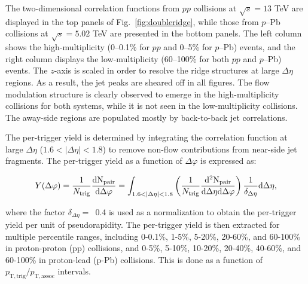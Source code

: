 The two-dimensional correlation functions from $pp$ collisions at $\sqrt{s}=13$ TeV are displayed in the top panels of Fig.~\ref{fig:doubleridge}, while those from $p$--Pb collisions at $\sqrt{s}=5.02$ TeV are presented in the bottom panels. The left column shows the high-multiplicity (0--0.1\% for $pp$ and 0--5\% for $p$--Pb) events, and the right column displays the low-multiplicity (60--100\% for both $pp$ and $p$--Pb) events.  
The $z$-axis is scaled in order to resolve the ridge structures at large $\Delta\eta$ regions.
As a result, the jet peaks are sheared off in all figures. The flow modulation structure is clearly observed to emerge in the high-multiplicity collisions for both systems, while it is not seen in the low-multiplicity collisions. The away-side regions are populated mostly by back-to-back jet correlations. 

The per-trigger yield is determined by integrating the correlation function at large $\Delta\eta$ ($1.6<|\Delta\eta|<1.8$) to remove non-flow contributions from near-side jet fragments.
The per-trigger yield as a function of $\Delta\varphi$ is expressed as:

\begin{eqnarray}
Y(\Delta\varphi) = \frac{1}{N_{\rm{trig}}} \frac{\rm{d}N_{\rm{pair}}}{\rm{d}\Delta\varphi} = \int_{1.6<|\Delta \eta|<1.8} \left(\frac{1}{N_{\rm{trig}}} \frac{\rm{d}^{2}N_{\rm{pair}}}{\rm{d}\Delta\eta \rm{d}\Delta\varphi}\right) \frac{1}{\delta_{\Delta\eta}} \rm{d}\Delta \eta,
\label{eq:pertrigger}
\end{eqnarray}

where the factor $\delta_{\Delta\eta}=$~0.4 is used as a normalization to obtain the per-trigger yield per unit of pseudorapidity.
The per-trigger yield is then extracted for multiple percentile ranges, including 0-0.1\%, 1-5\%, 5-20\%, 20-60\%, and 60-100\% in proton-proton (pp) collisions, and 0-5\%, 5-10\%, 10-20\%, 20-40\%, 40-60\%, and 60-100\% in proton-lead (p-Pb) collisions.  This is done as a function of $p_{\mathrm{T,trig}}/p_{\mathrm{T,assoc}}$ intervals.


